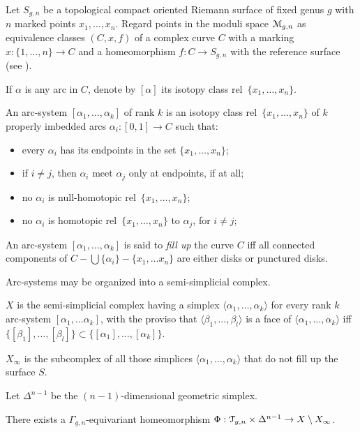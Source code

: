 Let $S_{g,n}$ be a topological compact oriented Riemann surface of
fixed genus $g$ with $n$ marked points $x_1, \ldots, x_n$.  Regard points
in the moduli space $\mathcal{M}_{g,n}$ as equivalence classes $(C,x,f)$ of a
complex curve $C$ with a marking $x:\{1,\ldots,n\}\to C$ and a homeomorphism
$f:C\to S_{g,n}$ with the reference surface (see
).

If $\alpha$ is any arc in $C$, denote by $[\alpha]$ its isotopy class rel~$\{x_1,
\ldots, x_n\}$.

\begin{definition}
  An arc-system $[\alpha_1, \ldots, \alpha_k]$ of rank $k$ is an isotopy class
  rel~$\{x_1, \ldots, x_n\}$ of $k$ properly imbedded arcs $\alpha_i : [0,1] \to C$
  such that:
  \begin{itemize}
  \item every $\alpha_i$ has its endpoints in the set $\{x_1, \ldots, x_n\}$;
  \item if $i \neq j$, then $\alpha_i$ meet $\alpha_j$ only at endpoints, if at all;
  \item no $\alpha_i$ is null-homotopic rel~$\{x_1, \ldots, x_n\}$;
  \item no $\alpha_i$ is homotopic rel~$\{x_1, \ldots, x_n\}$ to $\alpha_j$, for $i \neq
    j$;
  \end{itemize}
  An arc-system $[\alpha_1, \ldots, \alpha_k]$ is said to \emph{fill up} the curve
  $C$ iff all connected components of $C - \bigcup\{\alpha_i\} - \{x_1,\ldots x_n\}$ are
  either disks or punctured disks.
\end{definition}

Arc-systems may be organized into a semi-simplicial complex.
\begin{definition}
  $X$ is the semi-simplicial complex having a simplex $\langle\alpha_1, \ldots, \alpha_k\rangle$
  for every rank $k$ arc-system $[\alpha_1, \ldots \alpha_k]$, with the proviso that
  $\langle\beta_1, \ldots, \beta_l\rangle$ is a face of $\langle\alpha_1, \ldots, \alpha_k\rangle$ iff $\{ [\beta_1], \ldots, [\beta_l]
  \} \subset \{ [\alpha_1], \ldots, [\alpha_k] \}$.
  
  $X_\infty$ is the subcomplex of all those simplices $\langle\alpha_1, \ldots, \alpha_k\rangle$
  that do not fill up the surface $S$.
\end{definition}

Let $\Delta^{n-1}$ be the $(n-1)$-dimensional geometric simplex.
\begin{theorem}
There exists a $\Gamma_{g,n}$-equivariant homeomorphism $\Phi: \mathcal{T}_{g,n} \times
\Delta^{n-1} \to X \setminus X_\infty$.
\end{theorem}

